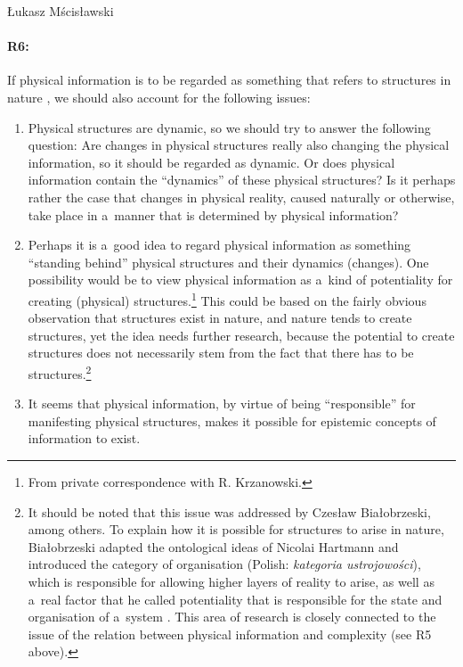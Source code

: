 \begin{artengenv}{Łukasz Mścisławski}
\paragraph{R6:} If physical information is to be regarded as something that refers to structures in nature
\parencite[][pp.86]{krzanowski_ontological_2022}, %
 we should also account for the following issues:
\begin{enumerate}[label=(\alph*)]
\item Physical structures are dynamic, so we should try to answer the following question: Are changes in physical structures really also changing the physical information, so it should be regarded as dynamic. Or does physical information contain the ``dynamics'' of these physical structures? Is it perhaps rather the case that changes in physical reality, caused naturally or otherwise, take place in a~manner that is determined by physical information?
\item Perhaps it is a~good idea to regard physical information as something ``standing behind'' physical structures and their dynamics (changes). One possibility would be to view physical information as a~kind of potentiality for creating (physical) structures.\footnote{From private correspondence with R. Krzanowski.} This could be based on the fairly obvious observation that structures exist in nature, and nature tends to create structures, yet the idea needs further research, because the potential to create structures does not necessarily stem from the fact that there has to be structures.\footnote{It should be noted that this issue was addressed by Czesław Białobrzeski, among others. To explain how it is possible for structures to arise in nature, Białobrzeski adapted the ontological ideas of Nicolai Hartmann and introduced the category of organisation (Polish: \textit{kategoria ustrojowości}), which is responsible for allowing higher layers of reality to arise, as well as a~real factor that he called potentiality that is responsible for the state and organisation of a~system
\parencites[cf.][pp.243–247]{bialobrzeski_podstawy_1984}[][]{mscislawski_miedzy_2017}. %
 This area of research is closely connected to the issue of the relation between physical information and complexity (see R5 above).}

\item It seems that physical information, by virtue of being ``responsible'' for manifesting physical structures, makes it possible for epistemic concepts of information to exist.
\end{enumerate}

\end{artengenv}
